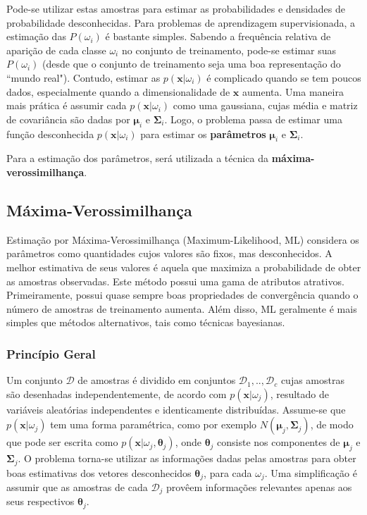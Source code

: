 \documentclass[a4paper,12pt,twocolumn]{article}
\begin{document}
Pode-se utilizar estas amostras para estimar as probabilidades e densidades de probabilidade desconhecidas. Para problemas de aprendizagem supervisionada, a estimação das $P(\omega_i)$ é bastante simples. Sabendo a frequência relativa de aparição de cada classe $\omega_i$ no conjunto de treinamento, pode-se estimar suas $P(\omega_i)$ (desde que o conjunto de treinamento seja uma boa representação do ``mundo real"). Contudo, estimar as $p(\boldsymbol{x}|\omega_i)$ é complicado quando se tem poucos dados, especialmente quando a dimensionalidade de $\boldsymbol{x}$ aumenta. Uma maneira mais prática é assumir cada $p(\boldsymbol{x}|\omega_i)$ como uma gaussiana, cujas média e matriz de covariância são dadas por $\boldsymbol{\mu}_i$ e $\boldsymbol{\Sigma}_i$. Logo, o problema passa de estimar uma função desconhecida $p(\boldsymbol{x}|\omega_i)$ para estimar os \textbf{parâmetros} $\boldsymbol{\mu}_i$ e $\boldsymbol{\Sigma}_i$.

Para a estimação dos parâmetros, será utilizada a técnica da \textbf{máxima-verossimilhança}.

\subsection{Máxima-Verossimilhança}

Estimação por Máxima-Verossimilhança (Maximum-Likelihood, ML) considera os parâmetros como quantidades cujos valores são fixos, mas desconhecidos. A melhor estimativa de seus valores é aquela que maximiza a probabilidade de obter as amostras observadas. Este método possui uma gama de atributos atrativos. Primeiramente, possui quase sempre boas propriedades de convergência quando o número de amostras de treinamento aumenta. Além disso, ML geralmente é mais simples que métodos alternativos, tais como técnicas bayesianas.

\subsubsection*{Princípio Geral}

Um conjunto $\mathcal{D}$ de amostras é dividido em conjuntos $\mathcal{D}_1, .., \mathcal{D}_c$ cujas amostras são desenhadas independentemente, de acordo com $p(\boldsymbol{x}|\omega_j)$, resultado de variáveis aleatórias independentes e identicamente distribuídas. Assume-se que $p(\boldsymbol{x}|\omega_j)$ tem uma forma paramétrica, como por exemplo $N(\boldsymbol{\mu}_j, \boldsymbol{\Sigma}_j)$, de modo que pode ser escrita como $p(\boldsymbol{x}|\omega_j, \boldsymbol{\theta}_j)$, onde $\boldsymbol{\theta}_j$ consiste nos componentes de $\boldsymbol{\mu}_j$ e $\boldsymbol{\Sigma}_j$. O problema torna-se utilizar as informações dadas pelas amostras para obter boas estimativas dos vetores desconhecidos $\boldsymbol{\theta}_j$, para cada $\omega_j$. Uma simplificação é assumir que as amostras de cada $\mathcal{D}_j$ provêem informações relevantes apenas aos seus respectivos $\boldsymbol{\theta}_j$.
\end{document}
